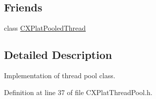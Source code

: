 \subsection*{\-Friends}
\begin{DoxyCompactItemize}
\item 
class \hyperlink{class_c_x_plat_thread_pool_ae5be1bd21210186249195fa418a3bbb8}{\-C\-X\-Plat\-Pooled\-Thread}
\end{DoxyCompactItemize}


\subsection{\-Detailed \-Description}
\-Implementation of thread pool class. 

\-Definition at line 37 of file \-C\-X\-Plat\-Thread\-Pool.\-h.



